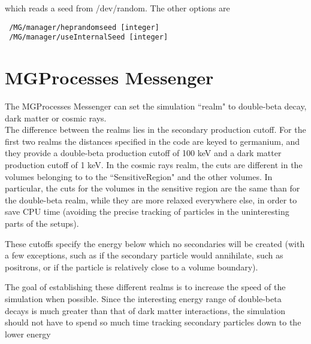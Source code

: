 \noindent which reads a seed from /dev/random.  The other options are

\begin{lstlisting}
 /MG/manager/heprandomseed [integer]
 /MG/manager/useInternalSeed [integer]
\end{lstlisting}


\section{MGProcesses Messenger} \label{macros-processes}


The MGProcesses Messenger can set the simulation ``realm" to double-{}beta decay, 
dark matter or cosmic rays.\\ 
The difference between the realms lies in the
secondary production cutoff. 
For the first two realms the distances specified in the code
are keyed to germanium, and they provide a double-{}beta production
cutoff of 100 keV and a dark matter production cutoff of 1 keV.
In the cosmic rays realm, the cuts are different in the volumes 
belonging to to the ``SensitiveRegion" and the other volumes. In particular, 
the cuts for the volumes in the sensitive region are the same than for 
the double-beta realm, while they are more relaxed everywhere else, in 
order to save CPU time (avoiding the precise tracking of particles in the
uninteresting parts of the setups). 
 

 These cutoffs specify the energy below which no secondaries will
be created (with a few exceptions, such as if the secondary
particle would annihilate, such as positrons, or if the particle
is relatively close to a volume boundary).


 The goal of establishing these different realms is to increase the
speed of the simulation when possible. Since the interesting energy
range of double-{}beta decays is much greater than that of dark
matter interactions, the simulation should not have to spend so
much time tracking secondary particles down to the lower energy

